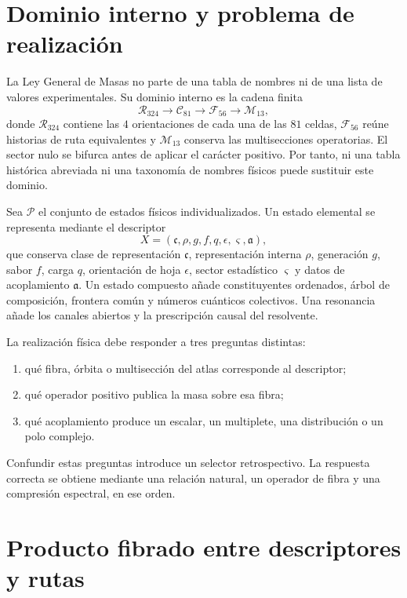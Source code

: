 \section{Dominio interno y problema de realización}

La Ley General de Masas no parte de una tabla de nombres ni de una lista de
valores experimentales. Su dominio interno es la cadena finita
\[
 \mathcal R_{324}\longrightarrow \mathcal C_{81}
 \longrightarrow \mathcal F_{56}\longrightarrow \mathcal M_{13},
\]
donde \(\mathcal R_{324}\) contiene las \(4\) orientaciones de cada una de las
\(81\) celdas, \(\mathcal F_{56}\) reúne historias de ruta equivalentes y
\(\mathcal M_{13}\) conserva las multisecciones operatorias. El sector nulo
se bifurca antes de aplicar el carácter positivo. Por tanto, ni una tabla
histórica abreviada ni una taxonomía de nombres físicos puede sustituir este
dominio.

Sea \(\mathcal P\) el conjunto de estados físicos individualizados. Un estado
elemental se representa mediante el descriptor
\[
 X=(\mathfrak c,\rho,g,f,q,\epsilon,\varsigma,\mathfrak a),
\]
que conserva clase de representación \(\mathfrak c\), representación interna
\(\rho\), generación \(g\), sabor \(f\), carga \(q\), orientación de hoja
\(\epsilon\), sector estadístico \(\varsigma\) y datos de acoplamiento
\(\mathfrak a\). Un estado compuesto añade constituyentes ordenados, árbol de
composición, frontera común y números cuánticos colectivos. Una resonancia
añade los canales abiertos y la prescripción causal del resolvente.

La realización física debe responder a tres preguntas distintas:

\begin{enumerate}
\item qué fibra, órbita o multisección del atlas corresponde al descriptor;
\item qué operador positivo publica la masa sobre esa fibra;
\item qué acoplamiento produce un escalar, un multiplete, una distribución o
      un polo complejo.
\end{enumerate}

Confundir estas preguntas introduce un selector retrospectivo. La respuesta
correcta se obtiene mediante una relación natural, un operador de fibra y una
compresión espectral, en ese orden.

\section{Producto fibrado entre descriptores y rutas}

